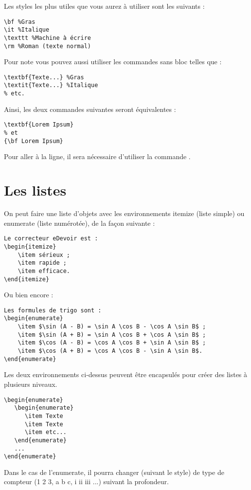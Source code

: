 Les styles les plus utiles que vous aurez à utiliser sont les suivants :
\begin{verbatim}
\bf %Gras
\it %Italique
\texttt %Machine à écrire
\rm %Roman (texte normal)
\end{verbatim}

Pour note vous pouvez aussi utiliser les commandes sans bloc telles que :
\begin{verbatim}
\textbf{Texte...} %Gras
\textit{Texte...} %Italique
% etc.
\end{verbatim}

Ainsi, les deux commandes suivantes seront équivalentes :
\begin{verbatim}
\textbf{Lorem Ipsum}
% et
{\bf Lorem Ipsum}
\end{verbatim}

Pour aller à la ligne, il sera nécessaire d'utiliser la commande .

\section{Les listes}
On peut faire une liste d'objets avec les environnements itemize (liste simple) ou enumerate (liste numérotée), de la façon suivante :
\begin{verbatim}
Le correcteur eDevoir est :
\begin{itemize}
	\item sérieux ;
	\item rapide ;
	\item efficace.
\end{itemize}
\end{verbatim}

Ou bien encore :
\begin{verbatim}
Les formules de trigo sont :
\begin{enumerate}
	\item $\sin (A - B) = \sin A \cos B - \cos A \sin B$ ;
	\item $\sin (A + B) = \sin A \cos B + \cos A \sin B$ ;
	\item $\cos (A - B) = \cos A \cos B + \sin A \sin B$ ;
	\item $\cos (A + B) = \cos A \cos B - \sin A \sin B$.
\end{enumerate}
\end{verbatim}

Les deux environnements ci-dessus peuvent être encapsulés pour créer des listes à plusieurs niveaux.
\begin{verbatim}
\begin{enumerate}
   \begin{enumerate}
      \item Texte
      \item Texte
      \item etc...
   \end{enumerate}
   ...
\end{enumerate}
\end{verbatim}
Dans le cas de l'enumerate, il pourra changer (suivant le style) de type de compteur (1 2 3, a b c, i ii iii ...) suivant la profondeur.

